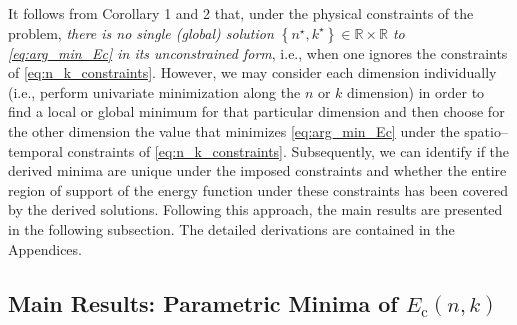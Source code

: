 \documentclass[twocolumn,english]{IEEEtran}
\theoremstyle{plain}
\theoremstyle{definition}
\begin{document}
It follows from Corollary 1 and 2 that, under the physical constraints
of the problem, \emph{there is no single (global) solution $\left\{ n^{\star},k^{\star}\right\} \in\mathcal{\mathbb{R\times R}}$
to \eqref{eq:arg_min_Ec} in its unconstrained form}, i.e., when one
ignores the constraints of \eqref{eq:n_k_constraints}. However, we
may consider each dimension individually (i.e., perform univariate
minimization along the $n$ or $k$ dimension) in order to find a
local or global minimum for that particular dimension and then choose
for the other dimension the value that minimizes \eqref{eq:arg_min_Ec}
under the spatio--temporal constraints of \eqref{eq:n_k_constraints}.
Subsequently, we can identify if the derived minima are unique under
the imposed constraints and whether the entire region of support of
the energy function under these constraints has been covered by the
derived solutions. Following this approach, the main results are presented
in the following subsection. The detailed derivations are contained
in the Appendices.


\subsection{Main Results: Parametric Minima of $E_{\text{c}}\left(n,k\right)$ }
\end{document}
